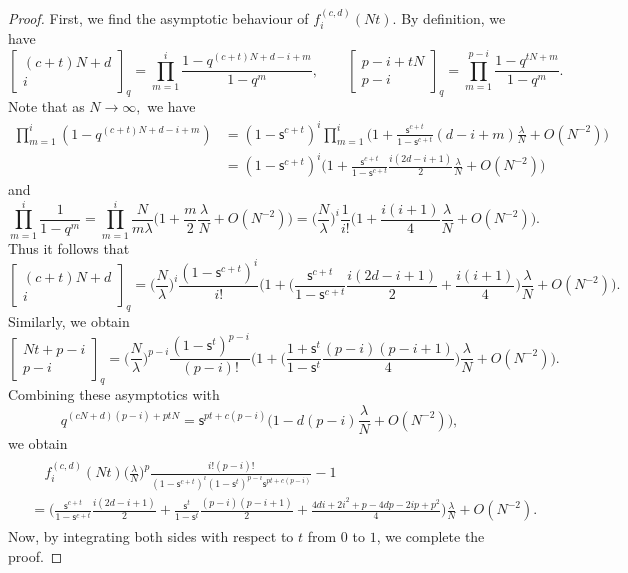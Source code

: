 \documentclass{amsart}
\newcommand{\qbinom}[2]{{\begin{bmatrix}#1\\#2\end{bmatrix}}_q}
\theoremstyle{plain}
\theoremstyle{remark}
\numberwithin{equation}{section}
\begin{document}
\begin{proof}
    First, we find the asymptotic behaviour of $f_{i}^{(c,d)}(Nt)$. By definition, we have
    \begin{equation*}
        \qbinom{(c+t)N+d}{i}=\prod_{m=1}^{i}\frac{1-q^{(c+t)N+d-i+m}}{1-q^{m}}, \qquad  \qbinom{p-i+tN}{p-i}=\prod_{m=1}^{p-i}\frac{1-q^{tN+m}}{1-q^{m}}. 
    \end{equation*}
    Note that as $N \to \infty,$ we have 
    \begin{equation*}
    \begin{split}
        \prod_{m=1}^{i}(1-q^{(c+t)N+d-i+m})
        &=(1-\mathsf{s}^{c+t})^{i}\prod_{m=1}^{i}\Big(1+\frac{\mathsf{s}^{c+t}}{1-\mathsf{s}^{c+t}}(d-i+m)\frac{\lambda}{N}+O(N^{-2})\Big)\\
        &=(1-\mathsf{s}^{c+t})^{i}\Big(1+\frac{\mathsf{s}^{c+t}}{1-\mathsf{s}^{c+t} }\frac{i(2d-i+1)}{2}\frac{\lambda}{N}+O(N^{-2})\Big)
    \end{split}
    \end{equation*}
    and
    \begin{equation*}
        \prod_{m=1}^{i}\frac{1}{1-q^{m}}=\prod_{m=1}^{i}\frac{N}{m\lambda}\Big(1+\frac{m}{2}\frac{\lambda}{N}+O(N^{-2})\Big)=\Big(\frac{N}{\lambda}\Big)^{i}\frac{1}{i!}\Big(1+\frac{i(i+1)}{4}\frac{\lambda}{N}+O(N^{-2})\Big).
    \end{equation*}
    Thus it follows that
    \begin{equation*}
        \qbinom{(c+t)N+d}{i}=\Big(\frac{N}{\lambda}\Big)^{i} \frac{(1-\mathsf{s}^{c+t})^{i}}{i!}\Big(1+\Big(\frac{\mathsf{s}^{c+t}}{1-\mathsf{s}^{c+t}}\frac{i(2d-i+1)}{2}+\frac{i(i+1)}{4}\Big)\frac{\lambda}{N}+O(N^{-2})\Big).
    \end{equation*} 
    Similarly, we obtain
    \begin{equation*}
        \qbinom{Nt+p-i}{p-i}=\Big(\frac{N}{\lambda}\Big)^{p-i}\frac{(1-\mathsf{s}^{t})^{p-i}}{(p-i)!}\Big(1+\Big(\frac{1+\mathsf{s}^{t} }{1-\mathsf{s}^{t}} \frac{(p-i)(p-i+1)}{4}\Big)\frac{\lambda}{N}+O(N^{-2})\Big).
    \end{equation*}
    Combining these asymptotics with
    \begin{equation*}
        q^{(cN+d)(p-i)+ptN}
        =\mathsf{s}^{pt+c(p-i)}\Big(1-d(p-i)\frac{\lambda}{N}+O(N^{-2})\Big),
    \end{equation*}
    we obtain  
    \begin{align} \label{eqn:f(Nt) asymptotic}
    \begin{split}
      &\quad f_{i}^{(c,d)}(Nt) \Big(\frac{\lambda}{N}\Big)^{p}\frac{i!(p-i)!}{(1-\mathsf{s}^{c+t})^{i}(1-\mathsf{s}^{t})^{p-i}\mathsf{s}^{pt+c(p-i)}} -1
        \\
        &=\bigg(\frac{\mathsf{s}^{c+t}}{1-\mathsf{s}^{c+t}}\frac{i(2d-i+1)}{2}+\frac{\mathsf{s}^{t}}{1-\mathsf{s}^{t}}\frac{(p-i)(p-i+1)}{2}+\frac{4di+2i^{2}+p-4dp-2ip+p^{2}}{4}\bigg)\frac{\lambda}{N}  +O(N^{-2}). 
    \end{split}
    \end{align} 
    Now, by integrating both sides with respect to $t$ from $0$ to $1$, we complete the proof.
\end{proof}
\end{document}
